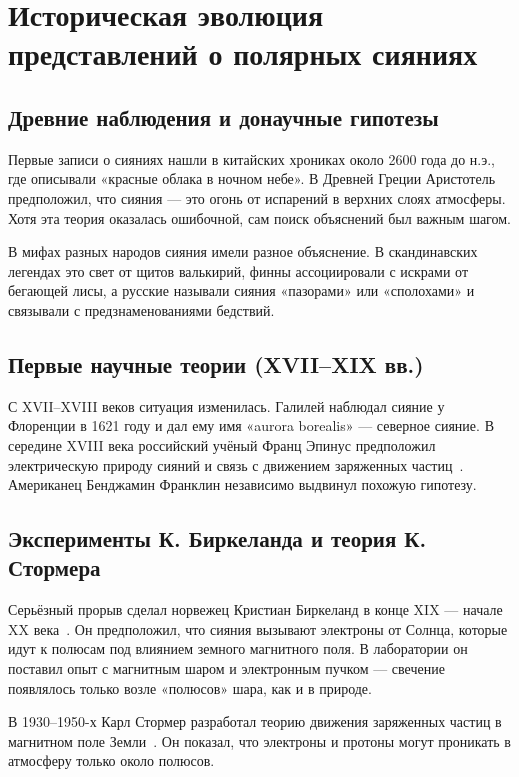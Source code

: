 \section{Историческая эволюция представлений о полярных сияниях}

\subsection{Древние наблюдения и донаучные гипотезы}

Первые записи о сияниях нашли в китайских хрониках около 2600 года до н.э., где описывали «красные облака в ночном небе». В Древней Греции Аристотель предположил, что сияния --- это огонь от испарений в верхних слоях атмосферы. Хотя эта теория оказалась ошибочной, сам поиск объяснений был важным шагом.

В мифах разных народов сияния имели разное объяснение. В скандинавских легендах это свет от щитов валькирий, финны ассоциировали с искрами от бегающей лисы, а русские называли сияния «пазорами» или «сполохами» и связывали с предзнаменованиями бедствий.

\subsection{Первые научные теории (XVII--XIX вв.)}

С XVII--XVIII веков ситуация изменилась. Галилей наблюдал сияние у Флоренции в 1621 году и дал ему имя «aurora borealis» --- северное сияние. В середине XVIII века российский учёный Франц Эпинус предположил электрическую природу сияний и связь с движением заряженных частиц~\cite{epinus1758}. Американец Бенджамин Франклин независимо выдвинул похожую гипотезу.

\subsection{Эксперименты К. Биркеланда и теория К. Стормера}

Серьёзный прорыв сделал норвежец Кристиан Биркеланд в конце XIX --- начале XX века~\cite{birkeland1908}. Он предположил, что сияния вызывают электроны от Солнца, которые идут к полюсам под влиянием земного магнитного поля. В лаборатории он поставил опыт с магнитным шаром и электронным пучком --- свечение появлялось только возле «полюсов» шара, как и в природе.

В 1930--1950-х Карл Стормер разработал теорию движения заряженных частиц в магнитном поле Земли~\cite{stormer1955}. Он показал, что электроны и протоны могут проникать в атмосферу только около полюсов.

